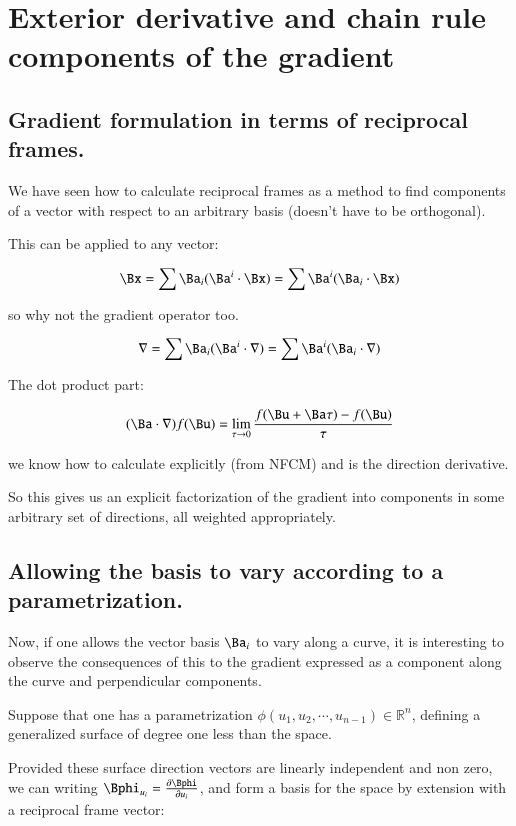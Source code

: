 \chapter{Exterior derivative and chain rule components of the gradient}

\section{Gradient formulation in terms of reciprocal frames. }

We have seen how to calculate reciprocal frames as a method to find
components of a vector with respect to an arbitrary basis (doesn't have
to be orthogonal).

This can be applied to any vector:

\[
\Bx = \sum \Ba_i (\Ba^i \cdot \Bx) = \sum \Ba^i (\Ba_i \cdot \Bx)
\]

so why not the gradient operator too.

\begin{equation}
\grad = \sum \Ba_i (\Ba^i \cdot \grad) = \sum \Ba^i (\Ba_i \cdot \grad)
\end{equation}

The dot product part:

\begin{equation}
(\Ba \cdot \grad) f(\Bu) = \lim_{\tau \rightarrow 0}
\frac{ f(\Bu + \Ba \tau) - f(\Bu ) }{ \tau }
\end{equation}

we know how to calculate explicitly (from NFCM) and is the direction
derivative.

So this gives us an explicit factorization of the gradient into components
in some arbitrary set of directions, all weighted appropriately.

\section{Allowing the basis to vary according to a parametrization. }

Now, if one allows the vector basis ${\Ba_i}$ to vary along a curve, it
is interesting to observe the consequences of this to the gradient expressed
as a component along the curve and perpendicular components.

Suppose that one has a parametrization $\phi(u_1, u_2, \cdots, u_{n-1}) \in \mathbb{R}^n$, defining a generalized surface of degree one less than the space.

Provided these surface direction vectors are linearly independent and non
zero, we can writing $\Bphi_{u_i} = \frac{\partial \Bphi}{ \partial u_i}$,
and form a basis for the space by extension with a reciprocal frame vector:

